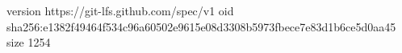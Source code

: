 version https://git-lfs.github.com/spec/v1
oid sha256:e1382f49464f534c96a60502e9615e08d3308b5973fbece7e83d1b6ce5d0aa45
size 1254
